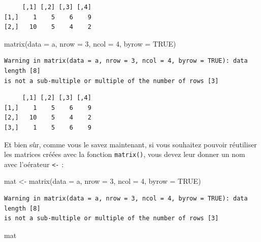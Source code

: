 \documentclass[
  french,
  a4paper,
  DIV=11,
  numbers=noendperiod,
  oneside]{scrreprt}
\newenvironment{Shaded}{}{}
\newcommand{\AttributeTok}[1]{\textcolor[rgb]{0.84,0.23,0.29}{#1}}
\newcommand{\ConstantTok}[1]{\textcolor[rgb]{0.00,0.36,0.77}{#1}}
\newcommand{\DecValTok}[1]{\textcolor[rgb]{0.00,0.36,0.77}{#1}}
\newcommand{\FunctionTok}[1]{\textcolor[rgb]{0.44,0.26,0.76}{#1}}
\newcommand{\NormalTok}[1]{\textcolor[rgb]{0.14,0.16,0.18}{#1}}
\newcommand{\OtherTok}[1]{\textcolor[rgb]{0.44,0.26,0.76}{#1}}
\begin{document}
\begin{tcolorbox}
\begin{verbatim}
     [,1] [,2] [,3] [,4]
[1,]    1    5    6    9
[2,]   10    5    4    2
\end{verbatim}

\begin{Shaded}
\begin{Highlighting}[]
\FunctionTok{matrix}\NormalTok{(}\AttributeTok{data =}\NormalTok{ a, }\AttributeTok{nrow =} \DecValTok{3}\NormalTok{, }\AttributeTok{ncol =} \DecValTok{4}\NormalTok{, }\AttributeTok{byrow =} \ConstantTok{TRUE}\NormalTok{)}
\end{Highlighting}
\end{Shaded}

\begin{verbatim}
Warning in matrix(data = a, nrow = 3, ncol = 4, byrow = TRUE): data length [8]
is not a sub-multiple or multiple of the number of rows [3]
\end{verbatim}

\begin{verbatim}
     [,1] [,2] [,3] [,4]
[1,]    1    5    6    9
[2,]   10    5    4    2
[3,]    1    5    6    9
\end{verbatim}

Et bien sûr, comme vous le savez maintenant, si vous souhaitez pouvoir
réutiliser les matrices créées avec la fonction \texttt{matrix()}, vous
devez leur donner un nom avec l'oérateur \texttt{\textless{}-} :

\begin{Shaded}
\begin{Highlighting}[]
\NormalTok{mat }\OtherTok{\textless{}{-}} \FunctionTok{matrix}\NormalTok{(}\AttributeTok{data =}\NormalTok{ a, }\AttributeTok{nrow =} \DecValTok{3}\NormalTok{, }\AttributeTok{ncol =} \DecValTok{4}\NormalTok{, }\AttributeTok{byrow =} \ConstantTok{TRUE}\NormalTok{)}
\end{Highlighting}
\end{Shaded}

\begin{verbatim}
Warning in matrix(data = a, nrow = 3, ncol = 4, byrow = TRUE): data length [8]
is not a sub-multiple or multiple of the number of rows [3]
\end{verbatim}

\begin{Shaded}
\begin{Highlighting}[]
\NormalTok{mat}
\end{Highlighting}
\end{Shaded}


\end{tcolorbox}
\end{document}
